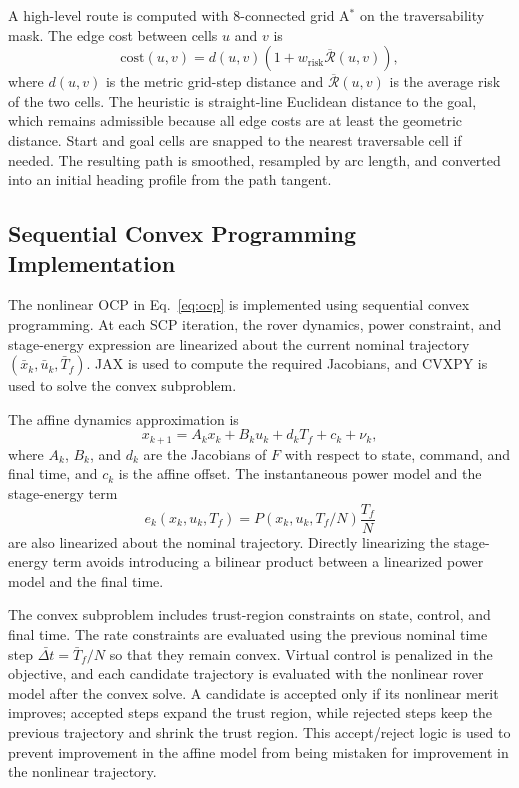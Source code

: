 A high-level route is computed with 8-connected grid A$^\ast$ on the traversability mask. The edge cost between cells $u$ and $v$ is
\begin{equation}
\mathrm{cost}(u,v) = d(u,v)\left(1+w_{\mathrm{risk}}\overline{\mathcal{R}}(u,v)\right),
\end{equation}
where $d(u,v)$ is the metric grid-step distance and $\overline{\mathcal{R}}(u,v)$ is the average risk of the two cells. The heuristic is straight-line Euclidean distance to the goal, which remains admissible because all edge costs are at least the geometric distance. Start and goal cells are snapped to the nearest traversable cell if needed. The resulting path is smoothed, resampled by arc length, and converted into an initial heading profile from the path tangent.

\subsection{Sequential Convex Programming Implementation}
The nonlinear OCP in Eq.~\eqref{eq:ocp} is implemented using sequential convex programming. At each SCP iteration, the rover dynamics, power constraint, and stage-energy expression are linearized about the current nominal trajectory $(\bar{x}_k,\bar{u}_k,\bar{T}_f)$. JAX is used to compute the required Jacobians, and CVXPY is used to solve the convex subproblem.

The affine dynamics approximation is
\begin{equation}
    x_{k+1}=A_kx_k+B_ku_k+d_kT_f+c_k+\nu_k,
\end{equation}
where $A_k$, $B_k$, and $d_k$ are the Jacobians of $F$ with respect to state, command, and final time, and $c_k$ is the affine offset. The instantaneous power model and the stage-energy term
\begin{equation}
    e_k(x_k,u_k,T_f)=P(x_k,u_k,T_f/N)\frac{T_f}{N}
\end{equation}
are also linearized about the nominal trajectory. Directly linearizing the stage-energy term avoids introducing a bilinear product between a linearized power model and the final time.

The convex subproblem includes trust-region constraints on state, control, and final time. The rate constraints are evaluated using the previous nominal time step $\bar{\Delta t}=\bar{T}_f/N$ so that they remain convex. Virtual control is penalized in the objective, and each candidate trajectory is evaluated with the nonlinear rover model after the convex solve. A candidate is accepted only if its nonlinear merit improves; accepted steps expand the trust region, while rejected steps keep the previous trajectory and shrink the trust region. This accept/reject logic is used to prevent improvement in the affine model from being mistaken for improvement in the nonlinear trajectory.

